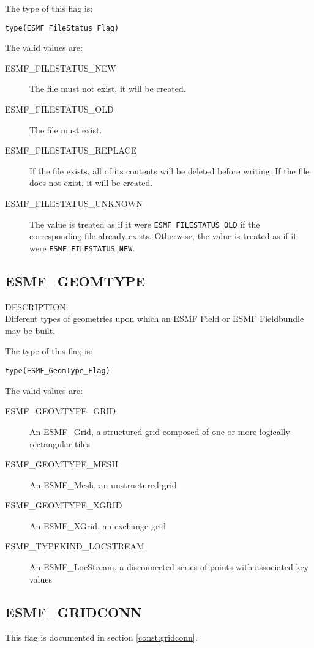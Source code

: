 The type of this flag is:

{\tt type(ESMF\_FileStatus\_Flag)}

The valid values are:
\begin{description}
\item [ESMF\_FILESTATUS\_NEW]
      The file must not exist, it will be created.
\item [ESMF\_FILESTATUS\_OLD]
      The file must exist.
\item [ESMF\_FILESTATUS\_REPLACE]
      If the file exists, all of its contents will be deleted before writing.
      If the file does not exist, it will be created.
\item [ESMF\_FILESTATUS\_UNKNOWN]
      The value is treated as if it were {\tt ESMF\_FILESTATUS\_OLD} if
      the corresponding file already exists. Otherwise, the value is
      treated as if it were {\tt ESMF\_FILESTATUS\_NEW}.

\end{description}

\subsection{ESMF\_GEOMTYPE}
\label{const:geomtype}

{\sf DESCRIPTION:\\}
Different types of geometries upon which an ESMF Field or ESMF Fieldbundle may
be built. 

The type of this flag is:

{\tt type(ESMF\_GeomType\_Flag)}

The valid values are:
\begin{description}
\item [ESMF\_GEOMTYPE\_GRID]
      An ESMF\_Grid, a structured grid composed of one or more logically rectangular tiles
\item [ESMF\_GEOMTYPE\_MESH]
      An ESMF\_Mesh, an unstructured grid
\item [ESMF\_GEOMTYPE\_XGRID]
      An ESMF\_XGrid, an exchange grid
\item [ESMF\_TYPEKIND\_LOCSTREAM]
      An ESMF\_LocStream, a disconnected series of points with associated key values
\end{description}

\subsection{ESMF\_GRIDCONN}
This flag is documented in section \ref{const:gridconn}.

